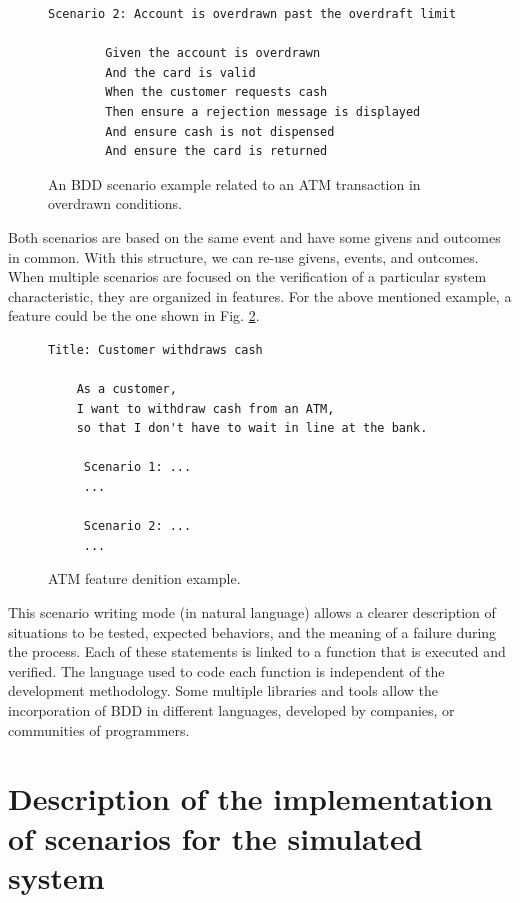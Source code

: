 \documentclass[journal]{IEEEtran}	%
\begin{document}
\begin{figure}[t]
\centering
\begin{lstlisting}[]
    Scenario 2: Account is overdrawn past the overdraft limit

        Given the account is overdrawn
        And the card is valid
        When the customer requests cash
        Then ensure a rejection message is displayed
        And ensure cash is not dispensed
        And ensure the card is returned
\end{lstlisting}
\caption{An BDD scenario example related to an ATM transaction in overdrawn conditions.}
\label{fig:ATMscenario2}
\end{figure}

Both scenarios are based on the same event and have some givens and outcomes in common. With this structure, we can re-use givens, events, and outcomes. When multiple scenarios are focused on the verification of a particular system characteristic, they are organized in features. For the above mentioned example, a feature could be the one shown in Fig. \ref{fig:ATMfeature}.

\begin{figure}[t!]
\centering
\begin{lstlisting}[]
   Title: Customer withdraws cash
    
    As a customer,
    I want to withdraw cash from an ATM,
    so that I don't have to wait in line at the bank.
    
     Scenario 1: ...
     ...
    
     Scenario 2: ...
     ...
\end{lstlisting}
\caption{ATM feature denition example.}
\label{fig:ATMfeature}
\end{figure}

This scenario writing mode (in natural language) allows a clearer description of situations to be tested, expected behaviors, and the meaning of a failure during the process. Each of these statements is linked to a function that is executed and verified. The language used to code each function is independent of the development methodology. Some multiple libraries and tools allow the incorporation of BDD in different languages, developed by companies, or communities of programmers.


\section{Description of the implementation of scenarios for the simulated system}
\end{document}
